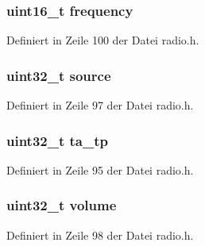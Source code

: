 \subsubsection[{frequency}]{\setlength{\rightskip}{0pt plus 5cm}uint16\+\_\+t frequency}\label{structradio__settings_aea762e0e67fcafaf5b3cd61201769926}


Definiert in Zeile 100 der Datei radio.\+h.

\hypertarget{structradio__settings_acced9a05ed6f381d74d67de65d66fa3b}{}
\subsubsection[{source}]{\setlength{\rightskip}{0pt plus 5cm}uint32\+\_\+t source}\label{structradio__settings_acced9a05ed6f381d74d67de65d66fa3b}


Definiert in Zeile 97 der Datei radio.\+h.

\hypertarget{structradio__settings_a104f6012667fb7152790a5a6f55c7781}{}
\subsubsection[{ta\+\_\+tp}]{\setlength{\rightskip}{0pt plus 5cm}uint32\+\_\+t ta\+\_\+tp}\label{structradio__settings_a104f6012667fb7152790a5a6f55c7781}


Definiert in Zeile 95 der Datei radio.\+h.

\hypertarget{structradio__settings_ae2b7935b01cdfe9a81d408dc3f2431f1}{}
\subsubsection[{volume}]{\setlength{\rightskip}{0pt plus 5cm}uint32\+\_\+t volume}\label{structradio__settings_ae2b7935b01cdfe9a81d408dc3f2431f1}


Definiert in Zeile 98 der Datei radio.\+h.

\hypertarget{structradio__settings_a22b4bf888b705c01b6914d4caaed08dd}{}
